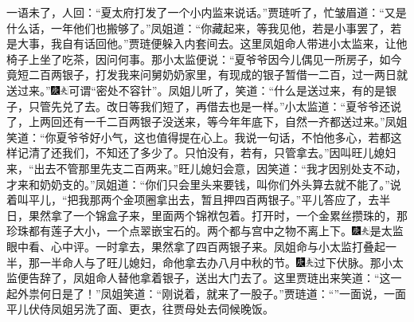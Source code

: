 一语未了，人回：``夏太府打发了一个小内监来说话。''贾琏听了，忙皱眉道：``又是什么话，一年他们也搬够了。''凤姐道：``你藏起来，等我见他，若是小事罢了，若是大事，我自有话回他。''贾琏便躲入内套间去。这里凤姐命人带进小太监来，让他椅子上坐了吃茶，因问何事。那小太监便说：``夏爷爷因今儿偶见一所房子，如今竟短二百两银子，打发我来问舅奶奶家里，有现成的银子暂借一二百，过一两日就送过来。''{\includegraphics[width=3mm]{../Images/00004}\includegraphics[width=3mm]{../Images/00012}\footnotesize \kaishu 可谓``密处不容针''。}凤姐儿听了，笑道：``什么是送过来，有的是银子，只管先兑了去。改日等我们短了，再借去也是一样。''小太监道：``夏爷爷还说了，上两回还有一千二百两银子没送来，等今年年底下，自然一齐都送过来。''凤姐笑道：``你夏爷爷好小气，这也值得提在心上。我说一句话，不怕他多心，若都这样记清了还我们，不知还了多少了。只怕没有，若有，只管拿去。''因叫旺儿媳妇来，``出去不管那里先支二百两来。''旺儿媳妇会意，因笑道：``我才因别处支不动，才来和奶奶支的。''凤姐道：``你们只会里头来要钱，叫你们外头算去就不能了。''说着叫平儿，``把我那两个金项圈拿出去，暂且押四百两银子。''平儿答应了，去半日，果然拿了一个锦盒子来，里面两个锦袱包着。打开时，一个金累丝攒珠的，那珍珠都有莲子大小，一个点翠嵌宝石的。两个都与宫中之物不离上下。{\includegraphics[width=3mm]{../Images/00004}\includegraphics[width=3mm]{../Images/00012}\footnotesize \kaishu 是太监眼中看、心中评。}一时拿去，果然拿了四百两银子来。凤姐命与小太监打叠起一半，那一半命人与了旺儿媳妇，命他拿去办八月中秋的节。{\includegraphics[width=3mm]{../Images/00004}\includegraphics[width=3mm]{../Images/00012}\footnotesize \kaishu 过下伏脉。}那小太监便告辞了，凤姐命人替他拿着银子，送出大门去了。这里贾琏出来笑道：``这一起外祟何日是了！''凤姐笑道：``刚说着，就来了一股子。''贾琏道：``''一面说，一面平儿伏侍凤姐另洗了面、更衣，往贾母处去伺候晚饭。


